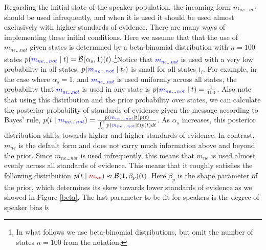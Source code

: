 \documentclass[linguex]{sp}
\theoremstyle{definition} \newtheorem{definition}{Definition}
\begin{document}
Regarding the initial state of the speaker population, the incoming form \textit{\color{blue} $m_{ne...not}$} should be used infrequently, and when it is used it should be used almost exclusively with higher standards of evidence. There are many ways of implementing these initial conditions. Here we assume that that the use of  \textit{\color{blue} $m_{ne...not}$} given states is determined by a beta-binomial distribution with $n=100$ states $p(\textcolor{blue}{m_{ne...not}} \mid t ) = \mathcal{B}(\alpha_{s}, 1)(t)$.\footnote{In what follows we use beta-binomial distributions, but omit the number of states $n=100$ from the notation.}Notice that \textcolor{blue}{$m_{ne...not}$} is used with a very low probability in all states, $p(\textcolor{blue}{m_{ne...not}} \mid t_i)$ is small for all states $t_i$. For example, in the case where $\alpha_s = 1$, and \textcolor{blue}{$m_{ne...not}$} is used uniformly across all states, the probability that \textcolor{blue}{$m_{ne...not}$} is used in any state is $p(\textcolor{blue}{m_{ne...not}} \mid t) = \frac{1}{100}$. Also note that using this distribution and the prior probability over states, we can calculate the posterior probability of standards of evidence given the message according to Bayes' rule, $p(t \mid \textcolor{blue}{m_{ne...not}}) = \frac{p(\textcolor{blue}{m_{ne...not}} \mid t ) p(t)}{\int_0^1 p(\textcolor{blue}{m_{ne...not}} \mid t ) p(t)dt}$. As $\alpha_{s}$ increases, this posterior distribution shifts towards higher and higher standards of evidence. In contrast, \textit{\color{red} $m_{ne}$} is the default form and does not carry much information above and beyond the prior. Since \textit{\color{blue} $m_{ne...not}$} is used infrequently, this means that \textit{\color{red} $m_{ne}$} is used almost evenly across all standards of evidence. This means that it roughly satisfies the following distribution $p(t \mid \textit{\color{red} $m_{ne}$}) \approx \mathcal B (1, \beta_p)(t)$. Here $\beta_p$ is the shape parameter of the prior, which determines its skew towards lower standards of evidence as we showed in Figure \ref{beta}. The last parameter to be fit for speakers is the degree of speaker bias $b$. 
\end{document}
